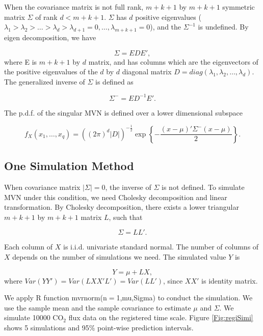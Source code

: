 \documentclass{article}
\begin{document}
When the covariance matrix is not full rank, $m+k+1$ by $m+k+1$ symmetric matrix $\Sigma$ of rank $d<m+k+1$. $\Sigma$ has $d$ positive eigenvalues ($\lambda_1>\lambda_2>\dots>\lambda_d>\lambda_{d+1}=0,\dots,\lambda_{m+k+1}=0$), and the $\Sigma^{-1}$ is undefined. By eigen decomposition, we have

\begin{equation}
\Sigma = EDE',
\end{equation}
where E is $m+k+1$ by $d$ matrix, and has columns which are the eigenvectors of the positive eigenvalues of the $d$ by $d$ diagonal matrix $D=diag(\lambda_1,\lambda_2,\dots,\lambda_d)$. The generalized inverse of $\Sigma$ is defined as

\begin{equation}
\Sigma^{-} = ED^{-1}E'.
\end{equation}

The p.d.f. of the singular MVN is defined over a lower dimensional subspace

\begin{equation}
f_{X}(x_1,\dots,x_{q}) = ((2\pi)^d|D|)^{-\frac{1}{2}}\exp\left\{-\frac{(x-\mu)'\Sigma^{-}(x-\mu)}{2}\right\}.
\end{equation}  


\subsection{One Simulation Method}

When covariance matrix $|\Sigma|=0$, the inverse of $\Sigma$ is not defined. To simulate MVN under this condition, we need Cholesky decomposition and linear transformation. By Cholesky decomposition, there exists a lower triangular $m+k+1$ by $m+k+1$ matrix $L$, such that 

\begin{equation}
\Sigma=LL'.
\end{equation}

Each column of $X$ is i.i.d. univariate standard normal. The number of columns of $X$ depends on the number of simulations we need. The simulated value $Y$ is

\begin{equation}
Y = \mu + LX,
\end{equation}  
where $Var(YY')= Var(LXX'L') = Var(LL')$, since $XX'$ is identity matrix. 

We apply R function mvrnorm(n$=$1,mu,Sigma) to conduct the simulation. We use the sample mean and the sample covariance to estimate $\mu$ and $\Sigma$.
We simulate 10000 CO$_2$ flux data on the registered time scale. Figure \ref{Fig:regiSimi} shows 5 simulations and 95\% point-wise prediction intervals.
\end{document}
